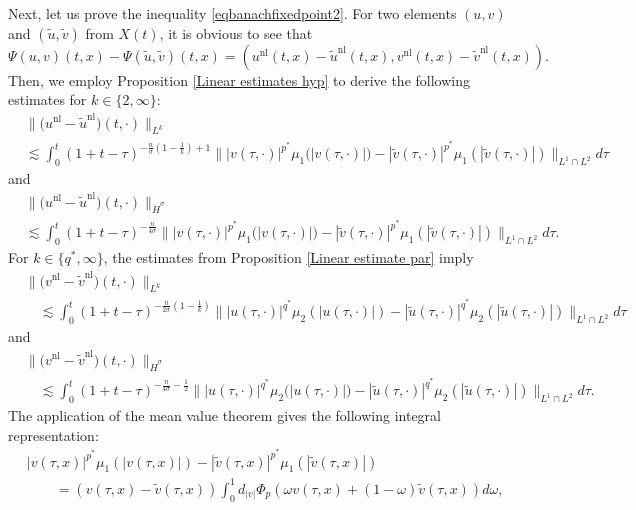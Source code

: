 \documentclass[11pt,reqno]{amsart}
\newcommand{\tron}[1]{\left( #1 \right)}
\numberwithin{equation}{section}
\begin{document}
Next, let us prove the inequality \eqref{eqbanachfixedpoint2}. For two elements $(u, v)$ and $(\tilde{u}, \tilde{v})$ from $X(t)$, it is obvious to see that
$$
\Psi(u, v)(t,x)-\Psi(\tilde{u}, \tilde{v})(t,x)=\left(u^{\mathrm{nl}}(t,x)-\tilde{u}^{\mathrm{nl}}(t,x), v^{\mathrm{nl}}(t,x)-\tilde{v}^{\mathrm{nl}}(t,x)\right).
$$
Then, we employ Proposition \ref{Linear estimates hyp} to derive the following estimates for $k \in \{2, \infty\}$:
\begin{align*}
& \big\|\big(u^{\mathrm{nl}}-\tilde{u}^{\mathrm{nl}}\big)(t, \cdot)\big\|_{L^k} \\
& \lesssim \int_0^t(1+t-\tau)^{-\frac{n}{\sigma}\tron{1-\frac{1}{k}}+1}\big\||v(\tau, \cdot)|^{p^*} \mu_1\big(|v(\tau, \cdot)|\big)-|\tilde{v}(\tau, \cdot)|^{p^*} \mu_1(|\tilde{v}(\tau, \cdot)|)\big\|_{L^1 \cap L^2} d \tau
\end{align*}
and 
\begin{align*}
& \big\|\big(u^{\mathrm{nl}}-\tilde{u}^{\mathrm{nl}}\big)(t, \cdot)\big\|_{\dot{H}^{\sigma}} \\
& \lesssim \int_0^t(1+t-\tau)^{-\frac{n}{4\sigma}}\big\||v(\tau, \cdot)|^{p^*} \mu_1\big(|v(\tau, \cdot)|\big)-|\tilde{v}(\tau, \cdot)|^{p^*} \mu_1(|\tilde{v}(\tau, \cdot)|)\big\|_{L^1 \cap L^2} d \tau.
\end{align*}
For $k \in \{q^*, \infty\}$, the estimates from Proposition \ref{Linear estimate par} imply
\begin{align*}
&\big\|\big(v^{\mathrm{nl}}-\tilde{v}^{\mathrm{nl}}\big)(t, \cdot)\big\|_{L^k} \\
&\quad \lesssim \int_0^t (1+t-\tau)^{-\frac{n}{2\sigma}\left(1-\frac{1}{k}\right)} \big\| |u(\tau,\cdot)|^{q^*} \mu_2(|u(\tau,\cdot)|) - |\tilde{u}(\tau,\cdot)|^{q^*} \mu_2(|\tilde{u}(\tau,\cdot)|) \big\|_{L^1 \cap L^2} d\tau
\end{align*}
and
\begin{align*}
& \big\|\big(v^{\mathrm{nl}}-\tilde{v}^{\mathrm{nl}}\big)(t, \cdot)\big\|_{\dot{H}^{\sigma}} \\
&\quad \lesssim \int_0^t(1+t-\tau)^{-\frac{n}{4\sigma}-\frac{1}{2}}\big\||u(\tau, \cdot)|^{q^*} \mu_2\big(|u(\tau, \cdot)|\big)-|\tilde{u}(\tau, \cdot)|^{q^*} \mu_2(|\tilde{u}(\tau, \cdot)|)\big\|_{L^1 \cap L^2} d \tau.
\end{align*}
The application of the mean value theorem gives the following integral representation:
\begin{align*}
&|v(\tau,x)|^{p^*} \mu_1(|v(\tau,x)|)-|\tilde{v}(\tau,x)|^{p^*} \mu_1(|\tilde{v}(\tau,x)|)\\
&\qquad =(v(\tau,x)-\tilde{v}(\tau,x)) \int_{0}^{1}d_{|v|} \Phi_p(\omega v(\tau,x)+(1-\omega) \tilde{v}(\tau,x)) d \omega,
\end{align*}
\end{document}
